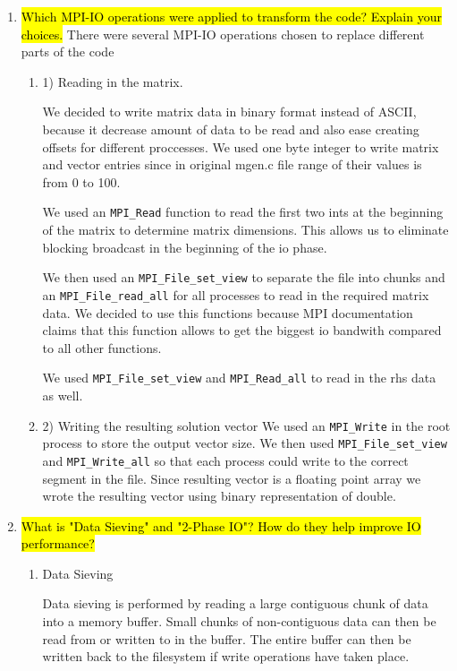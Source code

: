 \begin{enumerate}
  \item \hl{Which MPI-IO operations were applied to transform the code? Explain your choices.}
  There were several MPI-IO operations chosen to replace different parts of the code
  \begin{enumerate}
  \item 1) Reading in the matrix.
  
  We decided to write matrix data in binary format instead of ASCII, because it decrease amount of data to be read
  and also ease creating offsets for different proccesses. We used one byte integer to write matrix and vector entries
  since in original mgen.c file range of their values is from 0 to 100.

  We used an \verb!MPI_Read! function to read the first two ints at the beginning of the matrix to determine matrix dimensions.
  This allows us to eliminate blocking broadcast in the beginning of the io phase.

  We then used an \verb!MPI_File_set_view! to separate the file into chunks and an \verb!MPI_File_read_all! for all 
  processes to read in the required matrix data. We decided to use this functions because MPI documentation claims
  that this function allows to get the biggest io bandwith compared to all other functions.
  
  We used \verb!MPI_File_set_view! and \verb!MPI_Read_all! to read in the rhs data as well.
  
  \item 2) Writing the resulting solution vector
  We used an \verb!MPI_Write! in the root process to store the output vector size. We then used \verb!MPI_File_set_view!
  and \verb!MPI_Write_all! so that each process could write to the correct segment in the file. Since resulting vector 
  is a floating point array we wrote the resulting vector using binary representation of double.
  
  \end{enumerate}
  
  \item \hl{What is "Data Sieving" and "2-Phase IO"? How do they help improve IO
performance?}
	\begin{enumerate}
	\item Data Sieving
	
	Data sieving is performed by reading a large contiguous chunk of data into a memory buffer. Small chunks of non-contiguous data can then be read from or written to in the buffer. The entire buffer can then be written back to the filesystem if write operations have taken place.  
	

\end{enumerate}
\end{enumerate}

